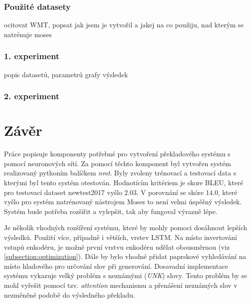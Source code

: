 \subsection{Použité datasety}
ocitovat WMT, popsat jak jsem je vytvořil a jakej na co použiju, nad kterým se natrénuje moses


\subsection{1. experiment}
popis datasetů, parametrů
grafy
výsledek
\subsection{2. experiment}

\chapter{Závěr}
Práce popisuje komponenty potřebné pro vytvoření překladového systému s pomocí neuronových sítí. Za pomocí těchto komponent byl vytvořen systém realizovaný pythoním balíčkem \emph{nmt}. Byly zvoleny trénovací a testovací data s kterými byl tento systém otestován. Hodnotícím kritériem je skore BLEU, které pro testovací dataset newtest2017 vyšlo 2.03. V porovnání se skóre 14.0, které vyšlo pro systém natrénovaný nástrojem Moses to není velmi úspěšný výsledek. Systém bude potřeba rozšířit a vylepšit, tak aby fungoval výrazně lépe.

Je několik vhodných rozšíření systému, které by mohly pomoci dosáhnout lepších výsledků. Použití více, případně i větších, vrstev LSTM. Na místo invertování vstupů enkodéru, je možné první vrstvu enkodéru udělat obousměrnou (viz \ref{subsection:optimization}). Dále by bylo vhodné přidat paprskové vyhledávání na místo hladového pro určování slov při generování. Dosavadní implementace systému vykazuje velký problém s neznámými (\emph{UNK}) slovy. Tento problém by se mohl vyřešit pomocí tzv. \emph{attention} mechanismu a přenášení neznámých slov v nezměněné podobě do výsledného překladu.


